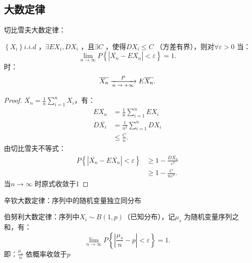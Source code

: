 \subsection{大数定律}%
\label{sub:大数定律}
\begin{notation}
    切比雪夫大数定律：
\end{notation}

\begin{defi}
    $\left\{ X_i \right\} i.i.d$ ，$\exists EX_i,DX_i$ ，且$\exists C$ ，使得$DX_i\le C$ （方差有界），则对$\forall \varepsilon>0$ 当：
    \[
        \lim_{n \to \infty} P\left\{ \left| \overline{X_n}-E\overline{X_n} \right| <\varepsilon \right\} =1
    .\] 
    时：
    \[
        \overline{X_n}\ce{->[$P$][$n\to +\infty $]}E\overline{X_n}
    .\] 
\end{defi}
\begin{proof}
    $\overline{X_n}={\frac{1}{n} \sum_{i=1}^{n} X_i}$，有：
    \begin{align*}
        E\overline{X_n}&=\frac{1}{n} \sum_{i=1}^{n} EX_i\\
        D\overline{X_i}&=\frac{1}{n^2} \sum_{i=1}^{n} DX_i\\
                  &\le \frac{C}{n}
    .\end{align*}
    由切比雪夫不等式：
    \begin{align*}
        P\left\{ \left| \overline{X_n}-E\overline{X_n} \right| <\varepsilon \right\} &\ge 1-\frac{D\overline{X_n}}{\varepsilon^2}\\
                                                                        &\ge 1-\frac{C}{n\varepsilon^2}
    .\end{align*}
    当$n\to \infty $ 时原式收敛于1
\end{proof}
\begin{notation}
    辛钦大数定律：序列中的随机变量独立同分布
\end{notation}
\begin{notation}
    伯努利大数定律：序列中$X_i\sim B\left( 1,p \right) $（已知分布），记$\mu_s$ 为随机变量序列之和，有：
    \[
        \lim_{n \to \infty} P\left\{ \left| \frac{\mu_s}{n} -p  \right| <\varepsilon \right\} =1
    .\] 
    即：${\frac{\mu_s}{n}} $ 依概率收敛于$p$
\end{notation}
